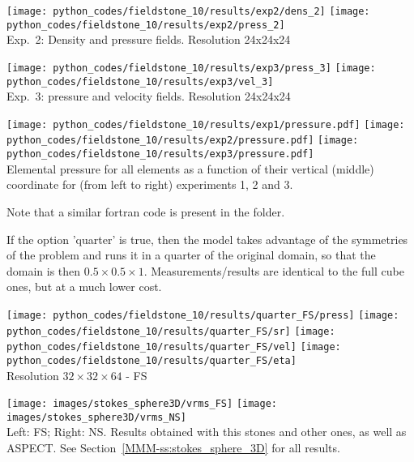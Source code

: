 \begin{center}
\texttt{[image: python\_codes/fieldstone\_10/results/exp2/dens\_2]}
\texttt{[image: python\_codes/fieldstone\_10/results/exp2/press\_2]}\\
{\small Exp.~2: Density and pressure fields. Resolution 24x24x24}
\end{center}


\begin{center}
\texttt{[image: python\_codes/fieldstone\_10/results/exp3/press\_3]}
\texttt{[image: python\_codes/fieldstone\_10/results/exp3/vel\_3]}\\
{\small Exp.~3: pressure and velocity fields. Resolution 24x24x24}
\end{center}

\begin{center}
\texttt{[image: python\_codes/fieldstone\_10/results/exp1/pressure.pdf]}
\texttt{[image: python\_codes/fieldstone\_10/results/exp2/pressure.pdf]}
\texttt{[image: python\_codes/fieldstone\_10/results/exp3/pressure.pdf]}\\
{\captionfont Elemental pressure for all elements as a function of their vertical 
(middle) coordinate for (from left to right) experiments 1, 2 and 3. }
\end{center}

Note that a similar fortran code is present in the folder. 

If the option 'quarter' is true, then the model takes advantage of the symmetries 
of the problem and runs it in a quarter of the original domain, so that 
the domain is then $0.5\times 0.5 \times 1$. Measurements/results are identical 
to the full cube ones, but at a much lower cost.

\begin{center}
\texttt{[image: python\_codes/fieldstone\_10/results/quarter\_FS/press]}
\texttt{[image: python\_codes/fieldstone\_10/results/quarter\_FS/sr]}
\texttt{[image: python\_codes/fieldstone\_10/results/quarter\_FS/vel]}
\texttt{[image: python\_codes/fieldstone\_10/results/quarter\_FS/eta]}\\
{\captionfont Resolution $32\times 32\times 64$ - FS}
\end{center}




\begin{center}
\texttt{[image: images/stokes\_sphere3D/vrms\_FS]}
\texttt{[image: images/stokes\_sphere3D/vrms\_NS]}\\
{\captionfont Left: FS; Right: NS. Results obtained with this stones and other ones, as well as ASPECT.
See Section~\ref{MMM-ss:stokes_sphere_3D} for all results.}
\end{center}
